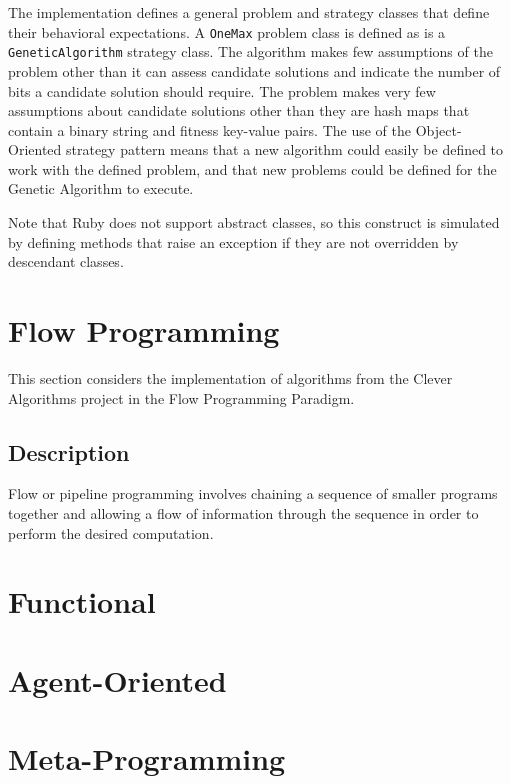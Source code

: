 \documentclass[a4paper, 11pt]{article}
\begin{document}
The implementation defines a general problem and strategy classes that define their behavioral expectations. A \texttt{OneMax} problem class is defined as is a \texttt{GeneticAlgorithm} strategy class. The algorithm makes few assumptions of the problem other than it can assess candidate solutions and indicate the number of bits a candidate solution should require. The problem makes very few assumptions about candidate solutions other than they are hash maps that contain a binary string and fitness key-value pairs. The use of the Object-Oriented strategy pattern means that a new algorithm could easily be defined to work with the defined problem, and that new problems could be defined for the Genetic Algorithm to execute.

Note that Ruby does not support abstract classes, so this construct is simulated by defining methods that raise an exception if they are not overridden by descendant classes.



\section{Flow Programming}
This section considers the implementation of algorithms from the Clever Algorithms project in the Flow Programming Paradigm.

\subsection{Description}
Flow or pipeline programming involves chaining a sequence of smaller programs together and allowing a flow of information through the sequence in order to perform the desired computation. 

\section{Functional}

\section{Agent-Oriented}

\section{Meta-Programming}
\end{document}
